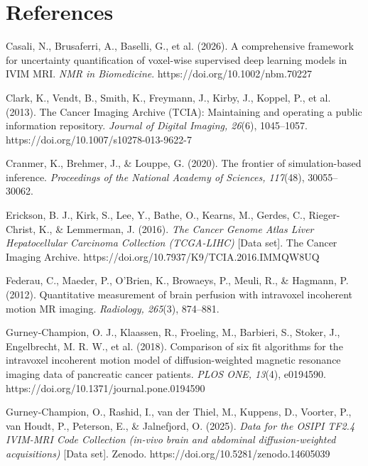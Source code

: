 \documentclass[11pt]{article}
\begin{document}
\section*{References}
\small
\begin{list}{}{\setlength{\leftmargin}{1.5em}\setlength{\itemindent}{-1.5em}\setlength{\itemsep}{3pt}}

\item Casali, N., Brusaferri, A., Baselli, G., et al. (2026). A comprehensive framework
for uncertainty quantification of voxel-wise supervised deep learning models in IVIM MRI.
\textit{NMR in Biomedicine}. https://doi.org/10.1002/nbm.70227

\item Clark, K., Vendt, B., Smith, K., Freymann, J., Kirby, J., Koppel, P., et al. (2013).
The Cancer Imaging Archive (TCIA): Maintaining and operating a public information
repository. \textit{Journal of Digital Imaging, 26}(6), 1045--1057.
https://doi.org/10.1007/s10278-013-9622-7

\item Cranmer, K., Brehmer, J., \& Louppe, G. (2020). The frontier of simulation-based
inference. \textit{Proceedings of the National Academy of Sciences, 117}(48),
30055--30062.

\item Erickson, B. J., Kirk, S., Lee, Y., Bathe, O., Kearns, M., Gerdes, C.,
Rieger-Christ, K., \& Lemmerman, J. (2016). \textit{The Cancer Genome Atlas Liver
Hepatocellular Carcinoma Collection (TCGA-LIHC)} [Data set]. The Cancer Imaging Archive.
https://doi.org/10.7937/K9/TCIA.2016.IMMQW8UQ

\item Federau, C., Maeder, P., O'Brien, K., Browaeys, P., Meuli, R., \& Hagmann, P.
(2012). Quantitative measurement of brain perfusion with intravoxel incoherent motion MR
imaging. \textit{Radiology, 265}(3), 874--881.

\item Gurney-Champion, O. J., Klaassen, R., Froeling, M., Barbieri, S., Stoker, J.,
Engelbrecht, M. R. W., et al. (2018). Comparison of six fit algorithms for the intravoxel
incoherent motion model of diffusion-weighted magnetic resonance imaging data of
pancreatic cancer patients. \textit{PLOS ONE, 13}(4), e0194590.
https://doi.org/10.1371/journal.pone.0194590

\item Gurney-Champion, O., Rashid, I., van der Thiel, M., Kuppens, D., Voorter, P., van
Houdt, P., Peterson, E., \& Jalnefjord, O. (2025). \textit{Data for the OSIPI TF2.4
IVIM-MRI Code Collection (in-vivo brain and abdominal diffusion-weighted acquisitions)}
[Data set]. Zenodo. https://doi.org/10.5281/zenodo.14605039


\end{list}
\end{document}
